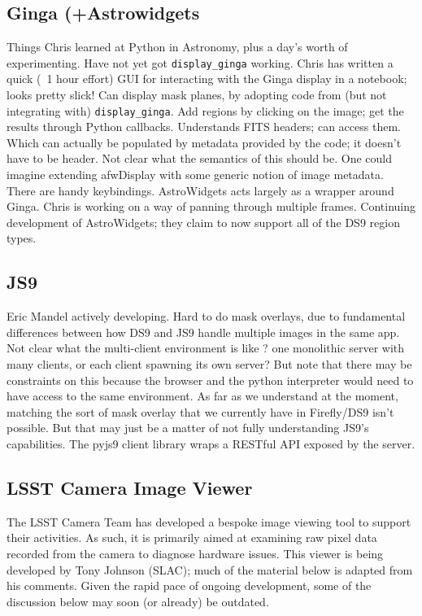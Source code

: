 \subsection{Ginga (+Astrowidgets}
Things Chris learned at Python in Astronomy, plus a day's worth of experimenting.
Have not yet got \texttt{display\_ginga} working.
Chris has written a quick (~1 hour effort) GUI for interacting with the Ginga display in a notebook; looks pretty slick!
Can display mask planes, by adopting code from (but not integrating with) \texttt{display\_ginga}.
Add regions by clicking on the image; get the results through Python callbacks.
Understands FITS headers; can access them.
Which can actually be populated by metadata provided by the code; it doesn't have to be header.
Not clear what the semantics of this should be.
One could imagine extending afwDisplay with some generic notion of image metadata.
There are handy keybindings.
AstroWidgets acts largely as a wrapper around Ginga.
Chris is working on a way of panning through multiple frames.
Continuing development of AstroWidgets; they claim to now support all of the DS9 region types.

\subsection{JS9}

Eric Mandel actively developing.
Hard to do mask overlays, due to fundamental differences between how DS9 and JS9 handle multiple images in the same app.
Not clear what the multi-client environment is like ? one monolithic server with many clients, or each client spawning its own server?
But note that there may be constraints on this because the browser and the python interpreter would need to have access to the same environment.
As far as we understand at the moment, matching the sort of mask overlay that we currently have in Firefly/DS9 isn't possible.
But that may just be a matter of not fully understanding JS9's capabilities.
The pyjs9 client library wraps a RESTful API exposed by the server.


\subsection{LSST Camera Image Viewer}
\label{sec:existing_tools:camera}

The LSST Camera Team has developed a bespoke image viewing tool to support their activities.
As such, it is primarily aimed at examining raw pixel data recorded from the camera to diagnose hardware issues.
This viewer is being developed by Tony Johnson (SLAC); much of the material below is adapted from his comments.
Given the rapid pace of ongoing development, some of the discussion below may soon (or already) be outdated.


